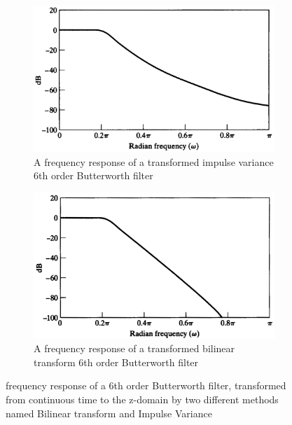 \begin{figure}[H]
	\setcounter{subfigure}{0}
	\centering
	\begin{subfigure}{.45\textwidth}
		\centering
		\includegraphics[width=\linewidth]{figures/BilinearFrequencyResponse.pdf}
		\caption{A frequency response of a transformed impulse variance 6th order Butterworth filter}
		\label{fig:ImpulseVarianceResponse}
	\end{subfigure}
	\hfill
	\begin{subfigure}{.45\textwidth}
		\centering
		\includegraphics[width=\linewidth]{figures/ImpulseVariantFrequencyResponse.pdf}
		\caption{A frequency response of a transformed bilinear transform 6th order Butterworth filter}
		\label{fig:BilinearTransformResponse}
	\end{subfigure}
	\caption{frequency response of a 6th order Butterworth filter, transformed from continuous time to the z-domain by two different methods named Bilinear transform and Impulse Variance}
		\label{fig:bilinearandimpulsevariance}
\end{figure}

